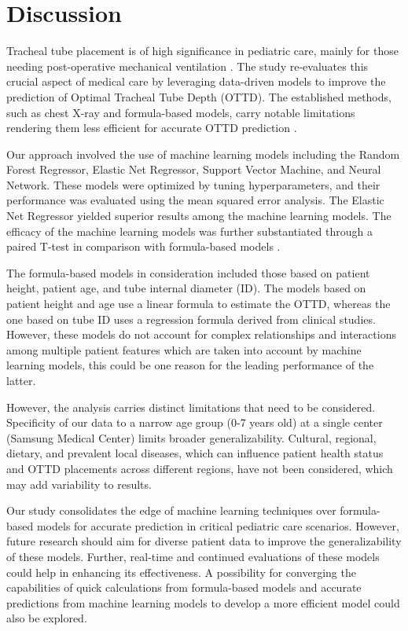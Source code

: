 \documentclass[11pt]{article}
\begin{document}
\section*{Discussion}

Tracheal tube placement is of high significance in pediatric care, mainly for those needing post-operative mechanical ventilation \cite{Kollef1994EndotrachealTM, Cook2005ThePL}. The study re-evaluates this crucial aspect of medical care by leveraging data-driven models to improve the prediction of Optimal Tracheal Tube Depth (OTTD). The established methods, such as chest X-ray and formula-based models, carry notable limitations rendering them less efficient for accurate OTTD prediction \cite{Tsoulfanidis1983MeasurementAD, Phipps2005ProspectiveAO}.

Our approach involved the use of machine learning models including the Random Forest Regressor, Elastic Net Regressor, Support Vector Machine, and Neural Network. These models were optimized by tuning hyperparameters, and their performance was evaluated using the mean squared error analysis. The Elastic Net Regressor yielded superior results among the machine learning models. The efficacy of the machine learning models was further substantiated through a paired T-test in comparison with formula-based models \cite{Yoo2021DeepLF}. 

The formula-based models in consideration included those based on patient height, patient age, and tube internal diameter (ID). The models based on patient height and age use a linear formula to estimate the OTTD, whereas the one based on tube ID uses a regression formula derived from clinical studies. However, these models do not account for complex relationships and interactions among multiple patient features which are taken into account by machine learning models, this could be one reason for the leading performance of the latter.

However, the analysis carries distinct limitations that need to be considered. Specificity of our data to a narrow age group (0-7 years old) at a single center (Samsung Medical Center) limits broader generalizability. Cultural, regional, dietary, and prevalent local diseases, which can influence patient health status and OTTD placements across different regions, have not been considered, which may add variability to results. 

Our study consolidates the edge of machine learning techniques over formula-based models for accurate prediction in critical pediatric care scenarios. However, future research should aim for diverse patient data to improve the generalizability of these models. Further, real-time and continued evaluations of these models could help in enhancing its effectiveness. A possibility for converging the capabilities of quick calculations from formula-based models and accurate predictions from machine learning models to develop a more efficient model could also be explored.
\end{document}
